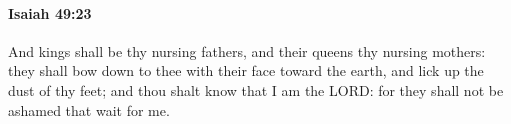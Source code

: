 
		\paragraph{Isaiah 49:23} %
			\label{ISAIAH-49-23}

			And kings shall be thy nursing fathers, and their queens thy nursing mothers: they shall bow down to thee with their face toward the earth, and lick up the dust of thy feet; and thou shalt know that I am the LORD: for they shall not be ashamed that wait for me.


